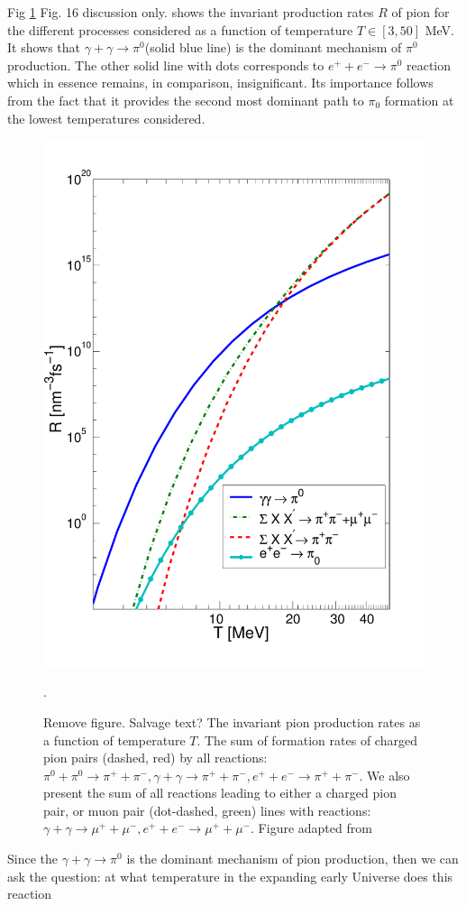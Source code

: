 \documentclass[universe,article,submit,moreauthors,pdftex,a4paper]{Definitions/mdpi}
\newcommand*{\xred}{\color{red}}
\begin{document}
Fig \ref{taumupi} {\xred Fig. 16 discussion only.} shows the invariant production rates $R$ of pion  for the different processes considered as a function of temperature $T\in [3,50]$ MeV. It shows that $\gamma+\gamma\to \pi^0$(solid blue line) is the dominant mechanism of $\pi^0$ production. The other solid line with dots corresponds to $e^++e^-\to \pi^0$ reaction which in essence remains, in comparison, insignificant. Its importance follows from the fact that it provides the second most dominant path to $\pi_0$ formation at the lowest temperatures considered.
\begin{figure}[h]
\centering
\includegraphics[width=0.6\columnwidth]{./plots/pions1.pdf}
\caption{{\xred Remove figure. Salvage text?} The invariant pion production rates as a function of temperature $T$. The sum of formation rates of charged pion pairs (dashed, red) by all reactions: $\pi^{0}+\pi^{0}\to \pi^{+}+\pi^{-},  \gamma+\gamma \to \pi^{+}+\pi^{-}, e^++e^-\to \pi^{+}+\pi^{-}$.
We also present the sum of all reactions leading to either a charged pion pair, or muon pair (dot-dashed, green) lines with reactions:$\gamma+\gamma \to \mu^{+}+\mu^{-}, e^++e^-\to \mu^{+}+\mu^{-}$. Figure adapted from \cite{Kuznetsova:2008jt}}.
\label{taumupi}
\end{figure}
Since the  $\gamma+\gamma\to \pi^0$ is the dominant mechanism of pion production, then we can ask the question: at what temperature in the expanding early Universe does this reaction
\end{document}

